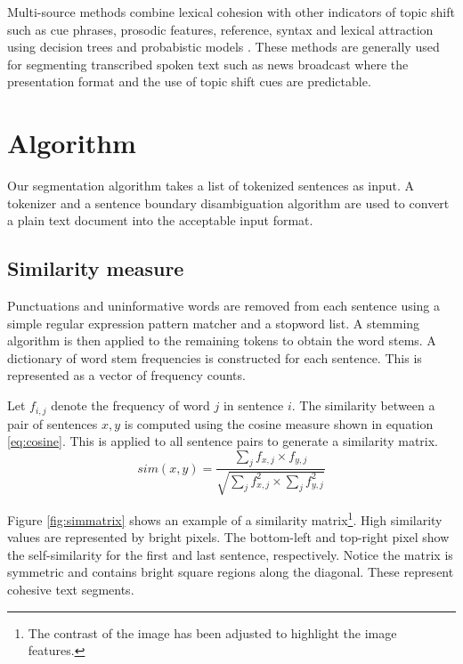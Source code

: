 \documentclass[11pt]{article}
\begin{document}
Multi-source methods combine lexical cohesion with other indicators of topic shift such as cue phrases, prosodic features, reference, syntax and lexical attraction \cite{beeferman_et_al_1997b} using decision trees \cite{litman_passonneau_1995} and probabistic models \cite{beeferman_et_al_1997,reynar_1998}. These methods are generally used for segmenting transcribed spoken text such as news broadcast where the presentation format and the use of topic shift cues are predictable.

\section{Algorithm}
Our segmentation algorithm takes a list of tokenized sentences as input. A tokenizer \cite{grefenstette_1994} and a sentence boundary disambiguation algorithm \cite{palmer_hearst_1994,reynar_ratnaparkhi_1997} are used to convert a plain text document into the acceptable input format. 

\subsection{Similarity measure}
Punctuations and uninformative words are removed from each sentence using a simple regular expression pattern matcher and a stopword list. A stemming algorithm \cite{porter_1980} is then applied to the remaining tokens to obtain the word stems. A dictionary of word stem frequencies is constructed for each sentence. This is represented as a vector of frequency counts.

Let $f_{i,j}$ denote the frequency of word $j$ in sentence $i$. The similarity between a pair of sentences $x,y$ is computed using the cosine measure \cite{hearst_1994} shown in equation \ref{eq:cosine}. This is applied to all sentence pairs to generate a similarity matrix.
\begin{equation}
sim(x,y) = \frac{\sum_{j} f_{x,j} \times f_{y,j}}{\sqrt{{\sum_{j} f_{x,j}^2} \times {\sum_{j} f_{y,j}^2}}}
\label{eq:cosine}
\end{equation}

Figure \ref{fig:simmatrix} shows an example of a similarity matrix\footnote{The contrast of the image has been adjusted to highlight the image features. }. High similarity values are represented by bright pixels. The bottom-left and top-right pixel show the self-similarity for the first and last sentence, respectively. Notice the matrix is symmetric and contains bright square regions along the diagonal. These represent cohesive text segments.
\end{document}
